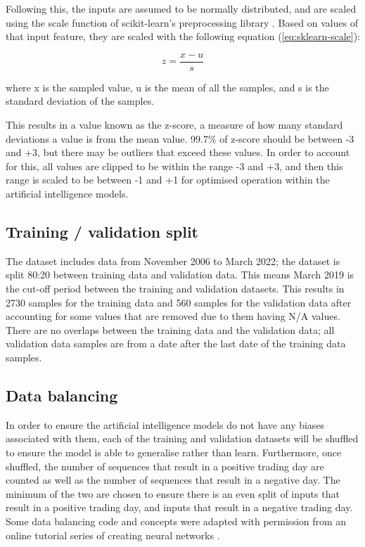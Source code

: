 Following this, the inputs are assumed to be normally distributed, and are scaled using the scale function of
scikit-learn's preprocessing library \parencite{scikit-learn}. Based on values of that input feature, they are scaled with the following
equation (\autoref{eq:sklearn-scale}):

\begin{equation}
    z = \frac{x - u}{s}
    \label{eq:sklearn-scale}
\end{equation}

where x is the sampled value, u is the mean of all the samples, and s is the standard deviation of the samples.

This results in a value known as the z-score, a measure of how many standard deviations a value is from the mean value.
99.7\% of z-score should be between -3 and +3, but there may be outliers that exceed these values. In order to account for this,
all values are clipped to be within the range -3 and +3, and then this range is scaled to be between -1 and +1 for optimised
operation within the artificial intelligence models.

\subsection{Training / validation split}
The dataset includes data from November 2006 to March 2022; the dataset is split 80:20 between training data and
validation data. This means March 2019 is the cut-off period between the training and validation datasets. This
results in 2730 samples for the training data and 560 samples for the validation data after accounting for some
values that are removed due to them having N/A values. There are no overlaps between the training data and the
validation data; all validation data samples are from a date after the last date of the training data samples.

\subsection{Data balancing}
In order to ensure the artificial intelligence models do not have any biases associated with them, each of the training
and validation datasets will be shuffled to ensure the model is able to generalise rather than learn. Furthermore, once
shuffled, the number of sequences that result in a positive trading day are counted as well as the number of sequences that result in
a negative day. The minimum of the two are chosen to ensure there is an even split of inputs that result in a positive trading day,
and inputs that result in a negative trading day. Some data balancing code and concepts were adapted with permission from
an online tutorial series of creating neural networks \parencite{kinsley_2018}.

